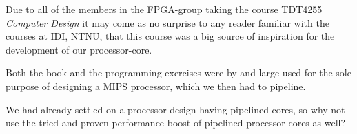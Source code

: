 Due to all of the members in the FPGA-group taking the course TDT4255 \emph{Computer Design}
it may come as no surprise to any reader familiar with the courses at IDI, NTNU,
that this course was a big source of inspiration for the development of our
processor-core.

Both the  book and the programming
exercises were by and large used for the sole purpose of designing a MIPS
processor, which we then had to pipeline.

We had already settled on a processor design having pipelined cores, so why not
use the tried-and-proven performance boost of pipelined processor cores as well?
